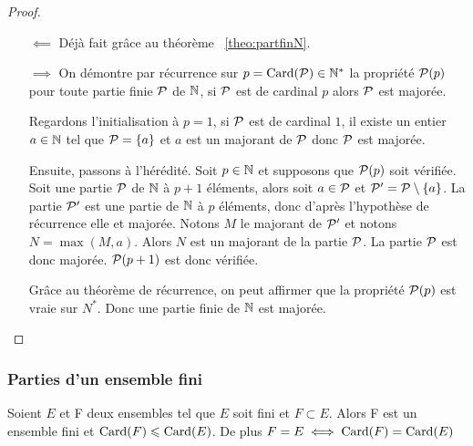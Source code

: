 \begin{proof}
  \begin{itemize}
    \item[\(\impliedby\)] Déjà fait grâce au théorème~
      \ref{theo:partfinN}.
    \item[\(\implies\)] On démontre par récurrence sur \(p = \Card(\P)\in 
      \N^*\) la propriété \(\P(p)\) pour toute partie finie \(\P\) de 
      \(\N\), si \(\P\) est de cardinal \(p\) alors \(\P\) est majorée. 

      Regardons l'initialisation à \(p = 1\), si \(\P\) est de cardinal \(1\), 
      il existe un entier \(a\in\N\) tel que \(\P = \{a\}\) et \(a\) est un 
      majorant de \(\P\) donc \(\P\) est majorée.

      Ensuite, passons à l'hérédité. Soit \(p \in \N\) et supposons que 
      \(\P(p)\) soit vérifiée. Soit une partie \(\P\) de \(\N\) à \(p + 1\) 
      éléments, alors soit \(a\in \P\) et \(\P'=\P\setminus\{a\}\). La 
      partie \(\P'\) est une partie de \(\N\) à \(p\) éléments, donc d'après 
      l'hypothèse de récurrence elle et majorée. Notons \(M\) le majorant de 
      \(\P'\) et notons \(N = \max(M, a)\). Alors \(N\) est un majorant de la 
      partie \(\P\). La partie \(\P\) est donc majorée. \(\P(p + 1)\) est donc 
      vérifiée.

      Grâce au théorème de récurrence, on peut affirmer que la propriété 
      \(\P(p)\) est vraie sur \(N^*\). Donc une partie finie de \(\N\) est 
      majorée.
  \end{itemize}
\end{proof}

\subsubsection{Parties d'un ensemble fini}

\begin{theo}\label{theo:partiesfinies}
  Soient \(E\) et F deux ensembles tel que \(E\) soit fini et \(F\subset 
  E\).  Alors F est un ensemble fini et \(\Card(F)\leqslant\Card(E)\). De 
  plus \(F = E \iff \Card(F)=\Card(E)\)
\end{theo}

